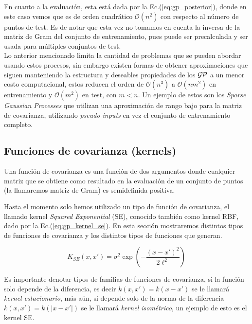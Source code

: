 En cuanto a la evaluación, esta está dada por la Ec.(\ref{eq:gp_posterior}), donde en este caso vemos que es de orden cuadrático $\mathcal{O}(n^2)$ con respecto al número de puntos de test. Es de notar que esta vez no tomamos en cuenta la inversa de la matriz de Gram del conjunto de entrenamiento, pues puede ser precalculada y ser usada para múltiples conjuntos de test.\\

Lo anterior mencionado limita la cantidad de problemas que se pueden abordar usando estos procesos, sin embargo existen formas de obtener aproximaciones que siguen manteniendo la estructura y deseables propiedades de los $\mathcal{GP}$ a un menor costo computacional, estos reducen el orden de $\mathcal{O}(n^3)$ a $\mathcal{O}(nm^2)$ en entrenamiento y $\mathcal{O}(m^2)$ en test, con $m<n$. Un ejemplo de estos son los \textit{Sparse Gaussian Processes} que utilizan una aproximación de rango bajo para la matriz de covarianza, utilizando \textit{pseudo-inputs} en vez el conjunto de entrenamiento completo.


\subsection{Funciones de covarianza (kernels)}

Una función de covarianza es una función de dos argumentos donde cualquier matriz que se obtiene como resultado en la evaluación de un conjunto de puntos (la llamaremos matriz de Gram) es semidefinida positiva.

Hasta el momento solo hemos utilizado un tipo de función de covarianza, el llamado kernel \textit{Squared Exponential} (SE), conocido también como kernel RBF, dado por la Ec.(\ref{eq:gp_kernel_se}). En esta sección mostraremos distintos tipos de funciones de covarianza y los distintos tipos de funciones que generan.

\begin{equation}\label{eq:gp_kernel_se}
	K_{SE}(x, x') = \sigma^2 \exp\left( - \frac{\left( x- x'\right)^2}{2\ell^2} \right)
\end{equation}

Es importante denotar tipos de familias de funciones de covarianza, si la función solo depende de la diferencia, es decir $k(x, x')=k(x-x')$ se le llamará \textit{kernel estacionario}, más aún, si depende solo de la norma de la diferencia $k(x, x')=k(|x-x'|)$ se le llamará \textit{kernel isométrico}, un ejemplo de esto es el kernel SE.\\

